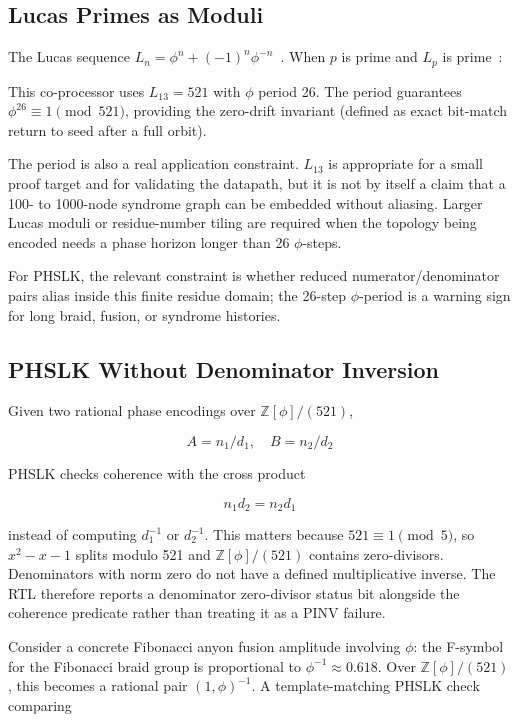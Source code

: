 \documentclass[conference]{IEEEtran}
\begin{document}
\subsection{Lucas Primes as Moduli}

The Lucas sequence $L_n = \phi^n + (-1)^n\phi^{-n}$~\cite{lucas}. When $p$ is prime and $L_p$ is prime~\cite{crandall}:

\LucasPrimeTable

This co-processor uses $L_{13}=521$ with $\phi$ period 26. The period guarantees $\phi^{26} \equiv 1 \pmod{521}$, providing the zero-drift invariant (defined as exact bit-match return to seed after a full orbit).

The period is also a real application constraint. $L_{13}$ is appropriate for a small proof target and for validating the datapath, but it is not by itself a claim that a 100- to 1000-node syndrome graph can be embedded without aliasing. Larger Lucas moduli or residue-number tiling are required when the topology being encoded needs a phase horizon longer than 26 $\phi$-steps.

For PHSLK, the relevant constraint is whether reduced numerator/denominator pairs alias inside this finite residue domain; the 26-step $\phi$-period is a warning sign for long braid, fusion, or syndrome histories.

\subsection{PHSLK Without Denominator Inversion}

Given two rational phase encodings over $\mathbb{Z}[\phi]/(521)$,

\[
A = n_1 / d_1,\quad B = n_2 / d_2
\]

PHSLK checks coherence with the cross product

\[
n_1 d_2 = n_2 d_1
\]

instead of computing $d_1^{-1}$ or $d_2^{-1}$. This matters because $521 \equiv 1 \pmod{5}$, so $x^2 - x - 1$ splits modulo 521 and $\mathbb{Z}[\phi]/(521)$ contains zero-divisors. Denominators with norm zero do not have a defined multiplicative inverse. The RTL therefore reports a denominator zero-divisor status bit alongside the coherence predicate rather than treating it as a PINV failure.

Consider a concrete Fibonacci anyon fusion amplitude involving $\phi$: the F-symbol for the Fibonacci braid group is proportional to $\phi^{-1} \approx 0.618$. Over $\mathbb{Z}[\phi]/(521)$, this becomes a rational pair $(1,\phi)^{-1}$. A template-matching PHSLK check comparing
\end{document}
